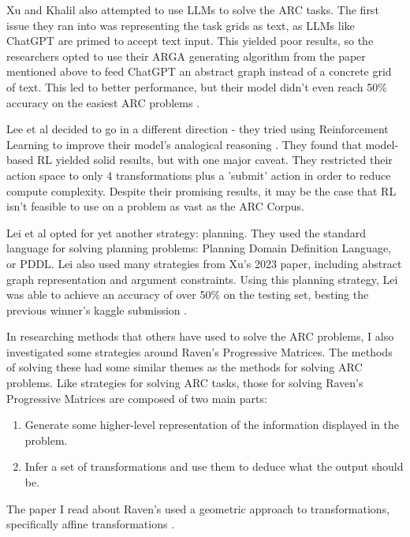 \documentclass[letterpaper]{article} %
\begin{document}
Xu and Khalil also attempted to use LLMs to solve the ARC tasks. The first issue they ran into was representing the task grids as text, as LLMs like ChatGPT are primed to accept text input. This yielded poor results, so the researchers opted to use their ARGA generating algorithm from the paper mentioned above to feed ChatGPT an abstract graph instead of a concrete grid of text. This led to better performance, but their model didn't even reach 50\% accuracy on the easiest ARC problems \cite{xu2024llmsabstractionreasoningcorpus}.

\bigskip

Lee et al decided to go in a different direction - they tried using Reinforcement Learning to improve their model's analogical reasoning \cite{lee2024enhancinganalogicalreasoningabstraction}. They found that model-based RL yielded solid results, but with one major caveat. They restricted their action space to only 4 transformations plus a 'submit' action in order to reduce compute complexity. Despite their promising results, it may be the case that RL isn't feasible to use on a problem as vast as the ARC Corpus.

\bigskip

Lei et al opted for yet another strategy: planning. They used the standard language for solving planning problems: Planning Domain Definition Language, or PDDL. Lei also used many strategies from Xu's 2023 paper, including abstract graph representation and argument constraints. Using this planning strategy, Lei was able to achieve an accuracy of over 50\% on the testing set, besting the previous winner's kaggle submission \cite{Lei_Lipovetzky_Ehinger_2024}.

\bigskip

In researching methods that others have used to solve the ARC problems, I also investigated some strategies around Raven's Progressive Matrices. The methods of solving these had some similar themes as the methods for solving ARC problems. Like strategies for solving ARC tasks, those for solving Raven's Progressive Matrices are composed of two main parts:
\begin{enumerate}
    \item Generate some higher-level representation of the information displayed in the problem.
    \item Infer a set of transformations and use them to deduce what the output should be.
\end{enumerate}
The paper I read about Raven's used a geometric approach to transformations, specifically affine transformations \cite{KUNDA201347}.
\end{document}
